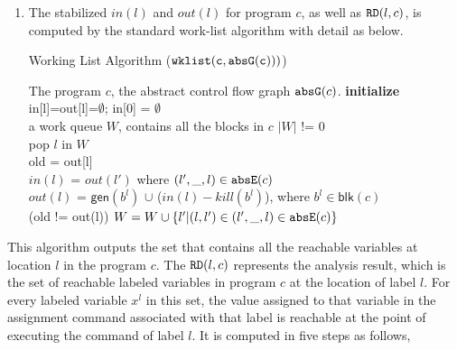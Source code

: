 \begin{enumerate}
%
\item The stabilized $in(l)$ and $out(l)$ for program $c$, as well as $\mathtt{RD}(l, c)$,
is computed by the standard work-list algorithm with detail as below. 
\begin{algorithm}
 \caption{
 {Working List Algorithm ({$\mathtt{wklist(c, \mathtt{abs}{\mathtt{G}}(c)))}$})}
 \label{alg:adapt}
 }
 \begin{algorithmic}[1]
 \REQUIRE The program $c$, the abstract control flow graph $\mathtt{abs}{\mathtt{G}}(c)$.
 \STATE \textbf{initialize} in[l]=out[l]=$\emptyset$; in[0] = $\emptyset$
 \\
 a work queue $W$, contains all the blocks in $c$
  $|W|$ != 0 \\
 \STATE \qquad pop $l$ in $W$ \\
 \STATE \qquad old = out[l] \\
 \STATE \qquad $in(l)$ = $out(l')$ where $(l',\_, l) \in \mathtt{abs}{\mathtt{E}}(c)$\\
 \STATE \qquad $out(l)$ = $\mathsf{gen}(b^l)$ $\cup$ ($in(l) - kill(b^l)$), where $b^l \in \mathsf{blk}(c)$ \\
 \STATE {} (old != out(l)) $W = W \cup \{l'| (l,l') \in (l',\_, l) \in \mathtt{abs}{\mathtt{E}}(c)\}$ 
 \end{algorithmic}
 \end{algorithm}
\end{enumerate}
%
This algorithm outputs the set that contains all the reachable variables at location $l$ in the program $c$.
The $\mathtt{RD}(l, c)$ represents the analysis result, which is the set of 
reachable labeled variables in program $c$ at the location of label $l$.
For every labeled variable $x^l$ in this set, 
the value assigned to that variable
in the assignment command associated with that label is reachable at the point of executing the command of label $l$.
It is computed in five steps as follows,

